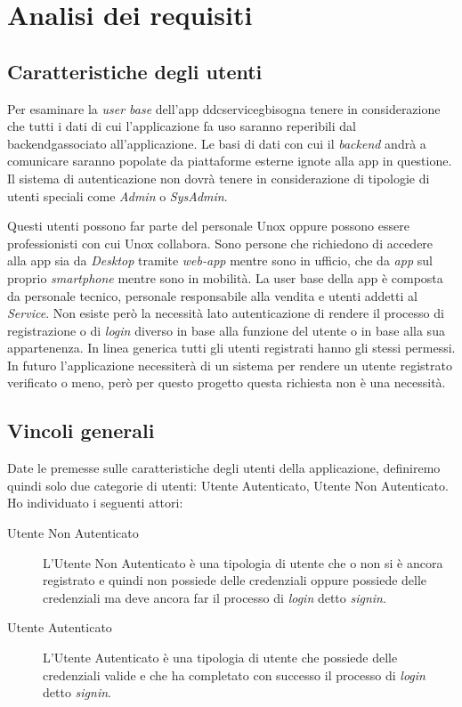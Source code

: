 \chapter{Analisi dei requisiti}
\label{chap:analisi_requisiti}

\section{Caratteristiche degli utenti}
Per esaminare la \textit{user base} dell'app \gls{ddcserviceg}\glox bisogna tenere in considerazione 
che tutti i dati di cui l'applicazione fa uso saranno reperibili dal \gls{backendg}\glox associato all'applicazione.
Le basi di dati con cui il \textit{backend} andrà a comunicare saranno popolate da piattaforme esterne ignote alla app in questione.
Il sistema di autenticazione non dovrà tenere in considerazione di tipologie di utenti speciali come \textit{Admin} o \textit{SysAdmin}.

Questi utenti possono far parte del personale Unox oppure possono essere professionisti con cui Unox collabora.
Sono persone che richiedono di accedere alla app sia da \textit{Desktop} tramite \textit{web-app} mentre sono in ufficio, che da \textit{app} sul proprio \textit{smartphone} mentre sono in mobilità.
La user base della app è composta da personale tecnico, personale responsabile alla vendita e utenti addetti al \textit{Service}.
Non esiste però la necessità lato autenticazione di rendere il processo di registrazione o di \textit{login} diverso in base alla funzione del utente o in base alla sua appartenenza.
In linea generica tutti gli utenti registrati hanno gli stessi permessi.
In futuro l'applicazione necessiterà di un sistema per rendere un utente registrato verificato o meno, però per questo progetto questa richiesta non è una necessità.

\section{Vincoli generali}
Date le premesse sulle caratteristiche degli utenti della applicazione, definiremo quindi solo due categorie di utenti: Utente Autenticato, Utente Non Autenticato.
Ho individuato i seguenti attori:
\begin{description}
	\item[Utente Non Autenticato] L'Utente Non Autenticato è una tipologia di utente che o non si è ancora registrato e quindi non possiede delle credenziali oppure possiede delle credenziali ma deve ancora far il processo di \textit{login} detto \textit{signin}.
	\item[Utente Autenticato] L'Utente Autenticato è una tipologia di utente che possiede delle credenziali valide e che ha completato con successo il processo di \textit{login} detto \textit{signin}.
\end{description}

